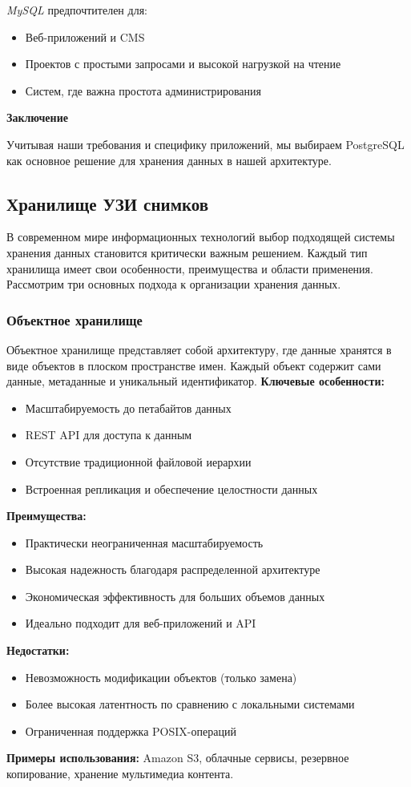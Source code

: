 \textit{MySQL} предпочтителен для:
\begin{itemize}
\item Веб-приложений и CMS
\item Проектов с простыми запросами и высокой нагрузкой на чтение
\item Систем, где важна простота администрирования
\end{itemize}

\textbf{Заключение}

Учитывая наши требования и специфику приложений, мы выбираем PostgreSQL как основное решение для хранения данных в нашей архитектуре.

\subsection{Хранилище УЗИ снимков}

В современном мире информационных технологий выбор подходящей системы хранения данных становится критически важным решением\cite{chamberlin2011nosql}. Каждый тип хранилища имеет свои особенности, преимущества и области применения. Рассмотрим три основных подхода к организации хранения данных.
\subsubsection*{Объектное хранилище}
Объектное хранилище представляет собой архитектуру, где данные хранятся в виде объектов в плоском пространстве имен. Каждый объект содержит сами данные, метаданные и уникальный идентификатор\cite{lin2016distributed}.
\textbf{Ключевые особенности:}
\begin{itemize}
\item Масштабируемость до петабайтов данных
\item REST API для доступа к данным
\item Отсутствие традиционной файловой иерархии
\item Встроенная репликация и обеспечение целостности данных
\end{itemize}
\textbf{Преимущества:}
\begin{itemize}
\item Практически неограниченная масштабируемость
\item Высокая надежность благодаря распределенной архитектуре
\item Экономическая эффективность для больших объемов данных
\item Идеально подходит для веб-приложений и API
\end{itemize}
\textbf{Недостатки:}
\begin{itemize}
\item Невозможность модификации объектов (только замена)
\item Более высокая латентность по сравнению с локальными системами
\item Ограниченная поддержка POSIX-операций
\end{itemize}
\textbf{Примеры использования:} Amazon S3, облачные сервисы, резервное копирование, хранение мультимедиа контента.
